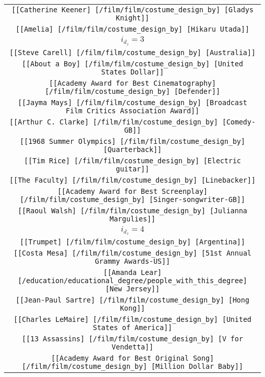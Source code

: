 \begin{longtable}{|c|}
    \texttt{[[Catherine Keener] [/film/film/costume\_design\_by] [Gladys Knight]]}\\
    \texttt{[[Amelia] [/film/film/costume\_design\_by] [Hikaru Utada]]}\\ \hline
    \rowcolor[HTML]{EFEFEF} 
    \textsc{$i_{d_z}=3$}\\ \hline
    \texttt{[[Steve Carell] [/film/film/costume\_design\_by] [Australia]]}\\
    \texttt{[[About a Boy] [/film/film/costume\_design\_by] [United States Dollar]]}\\
    \texttt{[[Academy Award for Best Cinematography] [/film/film/costume\_design\_by] [Defender]]}\\
    \texttt{[[Jayma Mays] [/film/film/costume\_design\_by] [Broadcast Film Critics Association Award]]}\\
    \texttt{[[Arthur C. Clarke] [/film/film/costume\_design\_by] [Comedy-GB]]}\\
    \texttt{[[1968 Summer Olympics] [/film/film/costume\_design\_by] [Quarterback]]}\\
    \texttt{[[Tim Rice] [/film/film/costume\_design\_by] [Electric guitar]]}\\
    \texttt{[[The Faculty] [/film/film/costume\_design\_by] [Linebacker]]}\\
    \texttt{[[Academy Award for Best Screenplay] [/film/film/costume\_design\_by] [Singer-songwriter-GB]]}\\
    \texttt{[[Raoul Walsh] [/film/film/costume\_design\_by] [Julianna Margulies]]}\\ \hline
    \rowcolor[HTML]{EFEFEF} 
    \textsc{$i_{d_z}=4$}\\ \hline
    \texttt{[[Trumpet] [/film/film/costume\_design\_by] [Argentina]]}\\
    \texttt{[[Costa Mesa] [/film/film/costume\_design\_by] [51st Annual Grammy Awards-US]]}\\
    \texttt{[[Amanda Lear] [/education/educational\_degree/people\_with\_this\_degree] [New Jersey]]}\\
    \texttt{[[Jean-Paul Sartre] [/film/film/costume\_design\_by] [Hong Kong]]}\\
    \texttt{[[Charles LeMaire] [/film/film/costume\_design\_by] [United States of America]]}\\
    \texttt{[[13 Assassins] [/film/film/costume\_design\_by] [V for Vendetta]]}\\
    \texttt{[[Academy Award for Best Original Song] [/film/film/costume\_design\_by] [Million Dollar Baby]]}\\

\end{longtable}

